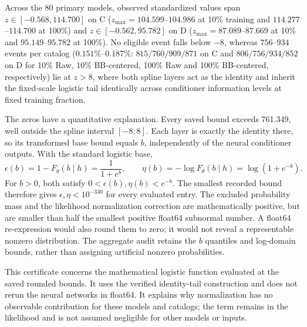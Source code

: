 Across the 80 primary models, observed standardized values span
$z\in[-0.568,114.700]$ on C ($z_{\max}=104.599$--$104.986$ at 10\% training
and $114.277$--$114.700$ at 100\%) and $z\in[-0.562,95.782]$ on D
($z_{\max}=87.089$--$87.669$ at 10\% and $95.149$--$95.782$ at 100\%). No
eligible event falls below $-8$, whereas $756$--$934$ events per catalog
($0.151\%$--$0.187\%$: $815/760/909/871$ on C and $806/756/934/852$ on D for
10\% Raw, 10\% BB-centered, 100\% Raw and 100\% BB-centered, respectively) lie
at $z>8$, where both spline layers act as the identity and inherit the
fixed-scale logistic tail identically across conditioner information levels at
fixed training fraction.

The zeros have a quantitative explanation. Every saved bound exceeds 761.349,
well outside the spline interval $[-8,8]$. Each layer is exactly the identity
there, so its transformed base bound equals $b$, independently of the neural
conditioner outputs. With the standard logistic base,
\begin{equation}
 \epsilon(b)=1-F_\theta(b\mid h)=\frac{1}{1+e^b},\qquad
 \eta(b)=-\log F_\theta(b\mid h)=\log(1+e^{-b}).
\end{equation}
For $b>0$, both satisfy $0<\epsilon(b),\eta(b)<e^{-b}$. The smallest recorded
bound therefore gives $\epsilon,\eta<10^{-330}$ for every evaluated entry.
The excluded probability mass and the likelihood normalization correction
are mathematically positive, but are smaller than half the smallest positive
float64 subnormal number. A float64 re-expression would also round them to
zero; it would not reveal a representable nonzero distribution. The aggregate
audit retains the $b$ quantiles and log-domain bounds, rather than assigning
artificial nonzero probabilities.

This certificate concerns the mathematical logistic function evaluated at the
saved rounded bounds. It uses the verified identity-tail construction and
does not rerun the neural networks in float64. It explains why normalization
has no observable contribution for these models and catalogs; the term remains
in the likelihood and is not assumed negligible for other models or inputs.
